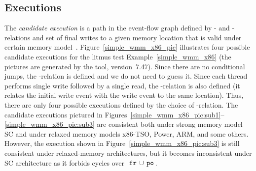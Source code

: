 \subsection{Executions}
\label{ch:wmm:model:executions}

The \textit{candidate execution} is a path in the event-flow graph defined by \po- and \rf-relations and set of final writes to a given memory location that is valid under certain memory model~\cite{alglave2014herding}. %
Figure~\ref{simple_wmm_x86_pic} illustrates four possible candidate executions for the litmus test Example~\ref{simple_wmm_x86} (the pictures are generated by the  tool, version~7.47).
Since there are no conditional jumps, the \po-relation is defined and we do not need to guess it.
Since each thread performs single write followed by a single read, the \co-relation is also defined (it relates the initial write event with the write event to the same location).
Thus, there are only four possible executions defined by the choice of \rf-relation.
The candidate executions pictured in Figures~\ref{simple_wmm_x86_pic:sub1}--\ref{simple_wmm_x86_pic:sub3} are consistent both under strong memory model SC and under relaxed memory models x86-TSO, Power, ARM, and some others.
However, the execution shown in Figure~\ref{simple_wmm_x86_pic:sub3} is still consistent under relaxed-memory architectures, but it becomes inconsistent under SC architecture as it forbids cycles over~$\,\mathtt{fr}\,\cup\,\mathtt{po}\,$.

